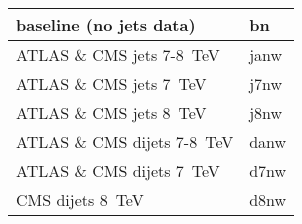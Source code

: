 \begin{tabularx}{\textwidth}{Xl}
    \toprule
    baseline (no jets data)                       &  bn          \\
    \midrule
    ATLAS \& CMS jets   7-8~TeV                   & janw         \\
    ATLAS \& CMS jets   7~TeV                     & j7nw          \\
    ATLAS \& CMS jets   8~TeV                     & j8nw      \\
    \midrule
    ATLAS \& CMS dijets 7-8~TeV                   & danw         \\
    ATLAS \& CMS dijets 7~TeV                     & d7nw          \\
    CMS          dijets 8~TeV                     & d8nw          \\
    \bottomrule
    \end{tabularx}

